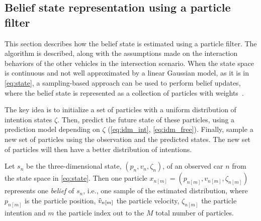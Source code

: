 \subsection{Belief state representation using a particle filter}
\label{sec:particle_filter}
This section describes how the belief state is estimated using a particle filter. The algorithm is described, along with the assumptions made on the interaction behaviors of the other vehicles in the intersection scenario. 
When the state space is continuous and not well approximated by a linear Gaussian model, as it is in \eqref{eq:state}, a sampling-based approach can be used to perform belief updates, where the belief state is represented as a collection of particles with weights~\cite{Kochenderfer2015}. 

The key idea is to initialize a set of particles with a uniform distribution of intention states $\zeta$. Then, predict the future state of these particles, using a prediction model depending on $\zeta$ (\ref{eq:idm_int}, \ref{eq:idm_free}). Finally, sample a new set of particles using the observation and the predicted states. The new set of particles will then have a better distribution of intentions. 

Let $s_n$ be the three-dimensional state, $( p_{n}, v_n, \zeta_n)$, of an observed car $n$ from the state space in \eqref{eq:state}. Then one particle $x_{n[m]} = ( p_{n[m]}, v_{n[m]}, \zeta_{n[m]} )$ represents one \textit{belief} of $s_n$, i.e., one sample of the estimated distribution, where $p_{n[m]}$ is the particle position, $\Tilde{v}_{n[m]}$ the particle velocity, $\zeta_{n[m]}$ the particle intention and $m$ the particle index out to the $M$ total number of particles. 

